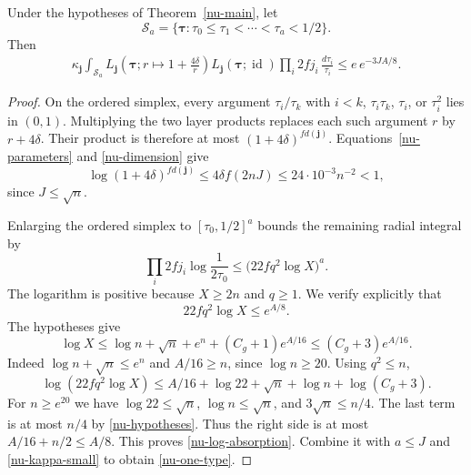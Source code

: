 \begin{lemma}\label{nu-radial-bound}
Under the hypotheses of Theorem~\ref{nu-main},
let
\[
 \mathcal S_a=\{\boldsymbol\tau:
                 \tau_0\le\tau_1<\cdots<\tau_a<1/2\}.
\]
Then
\begin{equation}\label{nu-one-type}
 \begin{split}
 \kappa_{\mathbf j}\int_{\mathcal S_a}
   L_{\mathbf j}\!\left(\boldsymbol\tau;
                 r\longmapsto1+\frac{4\delta}{r}\right)
   L_{\mathbf j}(\boldsymbol\tau;\operatorname{id})
             \prod_i2fj_i\,\frac{d\tau_i}{\tau_i}
                  \le e\,e^{-3JA/8}.
 \end{split}
\end{equation}
\end{lemma}
\begin{proof}
On the ordered simplex, every argument
$\tau_i/\tau_k$ with $i<k$, $\tau_i\tau_k$,
$\tau_i$, or $\tau_i^2$ lies in $(0,1)$.
Multiplying the two layer products replaces
each such argument $r$ by $r+4\delta$.
Their product is therefore at most
$(1+4\delta)^{fd(\mathbf j)}$.
Equations~\eqref{nu-parameters} and
\eqref{nu-dimension} give
\[
 \log(1+4\delta)^{fd(\mathbf j)}
 \le4\delta f(2nJ)
 \le 24\cdot10^{-3}n^{-2}<1,
\]
since $J\le\sqrt n$.

Enlarging the ordered simplex to
$[\tau_0,1/2]^a$ bounds the remaining radial
integral by
\[
 \prod_i2fj_i\log\frac1{2\tau_0}
        \le\bigl(22f q^2\log X\bigr)^a.
\]
The logarithm is positive because $X\ge2n$
and $q\ge1$.  We verify explicitly that
\begin{equation}\label{nu-log-absorption}
                   22f q^2\log X\le e^{A/8}.
\end{equation}
The hypotheses give
\[
 \log X\le\log n+\sqrt n+e^n+(C_g+1)e^{A/16}
                         \le(C_g+3)e^{A/16}.
\]
Indeed $\log n+\sqrt n\le e^n$ and
$A/16\ge n$, since $\log n\ge20$.
Using $q^2\le n$,
\[
 \log(22f q^2\log X)
       \le A/16+\log22+\sqrt n+\log n+\log(C_g+3).
\]
For $n\ge e^{20}$ we have
$\log22\le\sqrt n$, $\log n\le\sqrt n$,
and $3\sqrt n\le n/4$.
The last term is at most $n/4$ by
\eqref{nu-hypotheses}.  Thus the right side
is at most $A/16+n/2\le A/8$.
This proves \eqref{nu-log-absorption}.
Combine it with $a\le J$ and
\eqref{nu-kappa-small} to obtain
\eqref{nu-one-type}.
\end{proof}

